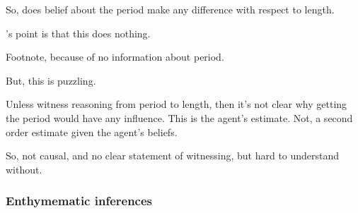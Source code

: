 \begin{note}
  So, does belief about the period make any difference with respect to length.

  \citeauthor{Tolliver:1982us}'s point is that this does nothing.

  Footnote, because of no information about period.

  But, this is puzzling.

  Unless witness reasoning from period to length, then it's not clear why getting the period would have any influence.
  This is the agent's estimate.
  Not, a second order estimate given the agent's beliefs.

  So, not causal, and no clear statement of witnessing, but hard to understand without.
\end{note}

\subsubsection{Enthymematic inferences}

